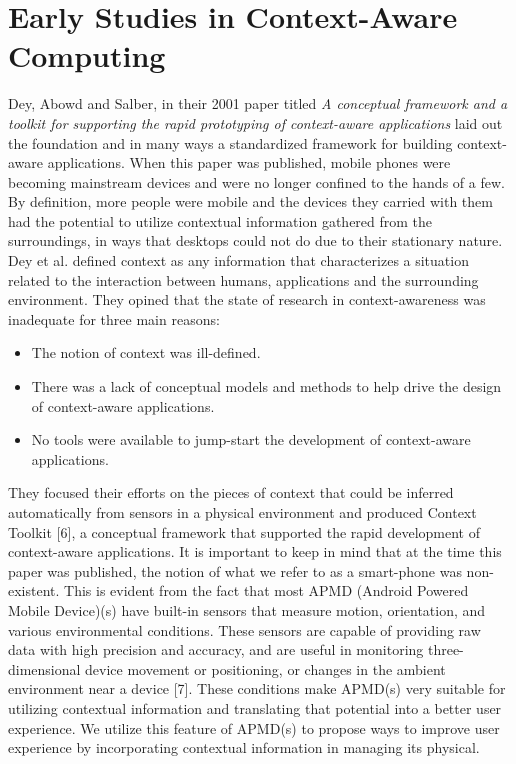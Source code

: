 \documentclass[12pt]{uthesis-v12}  %
\begin{document}
	\section{Early Studies in Context-Aware Computing}
		Dey, Abowd and Salber, in their 2001 paper titled {\em A conceptual framework and a toolkit for supporting the rapid prototyping of context-aware applications} laid out the foundation and in many ways a standardized framework for building context-aware applications. When this paper was published, mobile phones were becoming mainstream devices and were no longer confined to the hands of a few. By definition, more people were mobile and the devices they carried with them had the potential to utilize contextual information gathered from the surroundings, in ways that desktops could not do due to their stationary nature. Dey et al. defined context as any information that characterizes a situation related to the interaction between humans, applications and the surrounding environment. They opined that the state of research in context-awareness was inadequate for three main reasons:
		
		\begin{itemize}
			\item The notion of context was ill-defined.
			\item There was a lack of conceptual models and methods to help drive the design of context-aware applications.
			\item No tools were available to jump-start the development of context-aware applications.
		\end{itemize}
		
		 They focused their efforts on the pieces of context that could be inferred automatically from sensors in a physical environment and produced Context Toolkit [6], a conceptual framework that supported the rapid development of context-aware applications. It is important to keep in mind that at the time this paper was published, the notion of what we refer to as a smart-phone was non-existent. This is evident from the fact that most APMD (Android Powered Mobile Device)(s) have built-in sensors that measure motion, orientation, and various environmental conditions. These sensors are capable of providing raw data with high precision and accuracy, and are useful in monitoring three-dimensional device movement or positioning, or changes in the ambient environment near a device [7]. These conditions make APMD(s) very suitable for utilizing contextual information and translating that potential into a better user experience. We utilize this feature of APMD(s) to propose ways to improve user experience by incorporating contextual information in managing its physical.		
			
\end{document}
